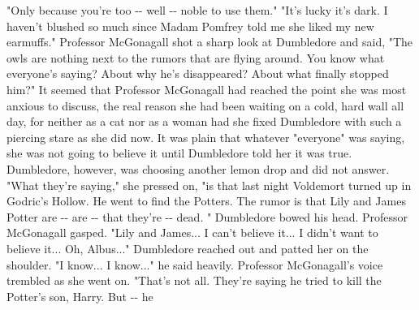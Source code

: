 \documentclass{article}%
\begin{document}
"Only because you're too {-}{-} well {-}{-} noble to use them."
\newline%
"It's lucky it's dark. I haven't blushed so much since Madam Pomfrey
\newline%
told me she liked my new earmuffs."
\newline%
Professor McGonagall shot a sharp look at Dumbledore and said, "The owls
\newline%
are nothing next to the rumors that are flying around. You know what
\newline%
everyone's saying? About why he's disappeared? About what finally
\newline%
stopped him?"
\newline%
It seemed that Professor McGonagall had reached the point she was most
\newline%
anxious to discuss, the real reason she had been waiting on a cold, hard
\newline%
wall all day, for neither as a cat nor as a woman had she fixed
\newline%
Dumbledore with such a piercing stare as she did now. It was plain that
\newline%
whatever "everyone" was saying, she was not going to believe it until
\newline%
Dumbledore told her it was true. Dumbledore, however, was choosing
\newline%
another lemon drop and did not answer.
\newline%
"What they're saying," she pressed on, "is that last night Voldemort
\newline%
turned up in Godric's Hollow. He went to find the Potters. The rumor is
\newline%
that Lily and James Potter are {-}{-} are {-}{-} that they're {-}{-} dead. "
\newline%
Dumbledore bowed his head. Professor McGonagall gasped.
\newline%
"Lily and James... I can't believe it... I didn't want to believe it...
\newline%
Oh, Albus..."
\newline%
Dumbledore reached out and patted her on the shoulder. "I know... I
\newline%
know..." he said heavily.
\newline%
Professor McGonagall's voice trembled as she went on. "That's not all.
\newline%
They're saying he tried to kill the Potter's son, Harry. But {-}{-} he
\end{document}

